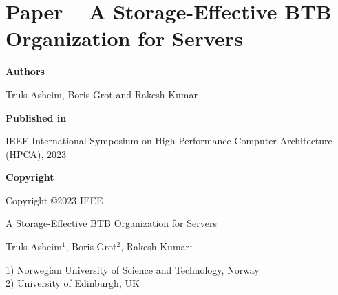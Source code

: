 \documentclass[../../../main.tex]{subfiles}
\begin{document}
\chapter{Paper  -- A Storage-Effective BTB Organization for Servers}
\label{chap:hpca-paper}

\noindent \textbf{Authors}

\vspace*{0.3cm}

\noindent Truls Asheim, Boris Grot and Rakesh Kumar

\vspace*{0.7cm}

\noindent \textbf{Published in}

\vspace*{0.3cm}

\noindent IEEE International Symposium on High-Performance Computer Architecture (HPCA), 2023

\vspace*{0.7cm}

\noindent \textbf{Copyright}

\vspace*{0.3cm}

\noindent Copyright ©2023 IEEE


\newpage

\vspace*{0.1cm}

\begin{center}

\Huge{A Storage-Effective BTB Organization for Servers}

\vspace{0.6cm}

\large{Truls Asheim$^{1}$, Boris Grot$^{2}$, Rakesh Kumar$^{1}$}

\vspace{0.1cm}

\small{1) Norwegian University of Science and Technology, Norway}\\
\small{2) University of Edinburgh, UK}


\end{center}

\vspace{0.2cm}
\end{document}
